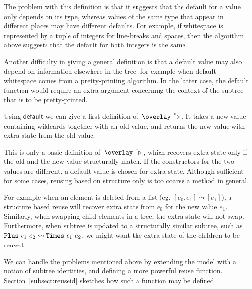 The problem with this definition is that it suggests that the default for a value only depends on its type, whereas values of the same type that appear in different places may have different defaults. For example, if whitespace is represented by a tuple of integers for line-breaks and spaces, then the algorithm above suggests that the default for both integers is the same.

Another difficulty in giving a general definition is that a default value may also depend on information elsewhere in the tree, for example when default whitespace comes from a pretty-printing algorithm. In the latter case, the default function would require an extra argument concerning the context of the subtree that is to be pretty-printed.

Using ${\mathsf {default}}$ we can give a first definition of $\reuzestar$. It takes a new value containing wildcards together with an old value, and returns the new value with extra state from the old value.


This is only a basic definition of $\reuzestar$, which recovers extra state only if the old and the new value structurally match. If the constructors for the two values are different, a default value is chosen for extra state. Although sufficient for some cases, reusing based on structure only is too coarse a method in general.

For example when an element is deleted from a list (eg. $[e_0, e_1] \leadsto [e_1]$), a structure based reuse will recover extra state from $e_0$ for the new value $e_1$. Similarly, when swapping child elements in a tree, the extra state will not swap. Furthermore, when subtree is updated to a structurally similar subtree, such as 
$\verb|Plus|~e_1~e_2 \leadsto \verb|Times|~e_1~e_2$, we might want the extra state of the children to be reused.

We can handle the problems mentioned above by extending the model with a notion of subtree identities, and defining a more powerful reuse function. Section~\ref{subsect:reuseid} sketches how such a function may be defined.



